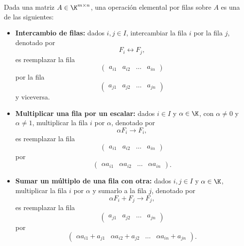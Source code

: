 \documentclass[compacto,10pt]{pubciencias-notas}
\begin{document}
\begin{defi}
    Dada una matriz $A\in\K^{m \times n}$, una operación elemental por filas sobre $A$ es una de las siguientes:
    \begin{itemize}
    \item   
        \textbf{Intercambio de filas:} dados $i , j \in I$, intercambiar la fila $i$ por la fila $j$, denotado por
        \[
            F_i \leftrightarrow F_j,
        \]
        es reemplazar la fila
        \[
            \begin{pmatrix}a_{i1}&a_{i2}&\ldots& a_{in}\end{pmatrix}
        \]
        por la fila
        \[
            \begin{pmatrix}a_{j1}&a_{j2}&\ldots& a_{jn}\end{pmatrix}
        \]
        y viceversa.
        \item 
        \textbf{Multiplicar una fila por un escalar:} dados $i\in I$ y $\alpha\in \K$, con $\alpha\neq 0$ y $\alpha \neq 1$, multiplicar la fila $i$ por $\alpha$, denotado por
        \[
            \alpha F_i \rightarrow F_i,
        \]
        es reemplazar la fila
        \[
            \begin{pmatrix}a_{i1}&a_{i2}&\ldots& a_{in}\end{pmatrix}
        \]
        por 
        \[
            \begin{pmatrix}\alpha a_{i1}&\alpha a_{i2}&\ldots&\alpha a_{in}\end{pmatrix}.
        \]
       \item 
        \textbf{Sumar un múltiplo de una fila con otra:} dados $i,j\in I$ y $\alpha\in \K$, multiplicar la fila $i$ por $\alpha$ y sumarlo a la fila $j$, denotado por
        \[
            \alpha F_i + F_j\rightarrow F_j,
        \]
        es reemplazar la fila
        \[
            \begin{pmatrix}a_{j1}&a_{j2}&\ldots& a_{jn}\end{pmatrix}
        \]
        por 
        \[
            \begin{pmatrix}\alpha a_{i1} + a_{j1}&\alpha a_{i2} + a_{j2}&\ldots&\alpha a_{in} + a_{jn}\end{pmatrix}.
        \]
        
\end{itemize}
\end{defi}
\end{document}
